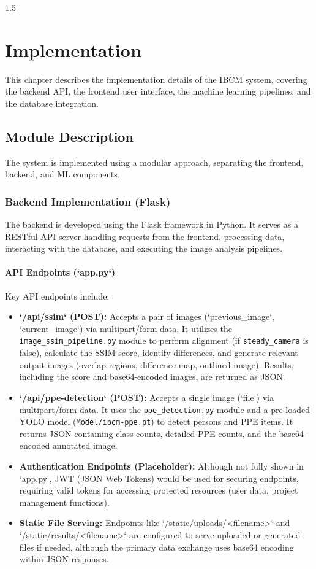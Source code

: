 \documentclass[12pt,a4paper]{report}
\begin{document}
\begin{spacing}{1.5}

    \chapter{Implementation}
    \label{chap:implementation}

    This chapter describes the implementation details of the IBCM system, covering the backend API, the frontend user interface, the machine learning pipelines, and the database integration.

    \section{Module Description}
    The system is implemented using a modular approach, separating the frontend, backend, and ML components.

    \subsection{Backend Implementation (Flask)}
    The backend is developed using the Flask framework in Python. It serves as a RESTful API server handling requests from the frontend, processing data, interacting with the database, and executing the image analysis pipelines.

    \subsubsection{API Endpoints (`app.py`)}
    Key API endpoints include:
    \begin{itemize}
        \item \textbf{`/api/ssim` (POST):} Accepts a pair of images (`previous\_image`, `current\_image`) via multipart/form-data. It utilizes the \texttt{image\_ssim\_pipeline.py} module to perform alignment (if \texttt{steady\_camera} is false), calculate the SSIM score, identify differences, and generate relevant output images (overlap regions, difference map, outlined image). Results, including the score and base64-encoded images, are returned as JSON.
        \item \textbf{`/api/ppe-detection` (POST):} Accepts a single image (`file`) via multipart/form-data. It uses the \texttt{ppe\_detection.py} module and a pre-loaded YOLO model (\texttt{Model/ibcm-ppe.pt}) to detect persons and PPE items. It returns JSON containing class counts, detailed PPE counts, and the base64-encoded annotated image.
        \item \textbf{Authentication Endpoints (Placeholder):} Although not fully shown in `app.py`, JWT (JSON Web Tokens) would be used for securing endpoints, requiring valid tokens for accessing protected resources (user data, project management functions).
        \item \textbf{Static File Serving:} Endpoints like `/static/uploads/<filename>` and `/static/results/<filename>` are configured to serve uploaded or generated files if needed, although the primary data exchange uses base64 encoding within JSON responses.
    \end{itemize}


\end{spacing}
\end{document}
